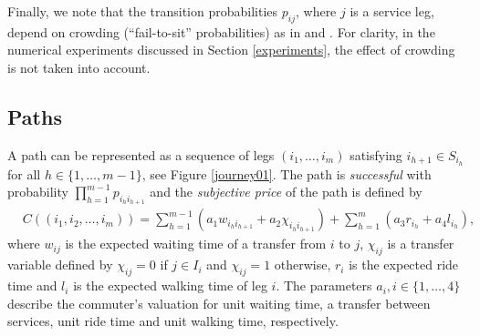 \documentclass[dissertation,draft*]{aaltoseries}
\begin{document}
Finally, we note that the transition probabilities $p_{ij}$, where $j$ is a service leg, depend on crowding (``fail-to-sit'' probabilities)
as in \cite{hamdouch} and \cite{schmocker}. For clarity, in the numerical experiments 
discussed in Section \ref{experiments}, the effect of crowding is not taken into account.

\subsection{Paths}
A path can be represented as a sequence of legs $(i_1,\ldots,i_m)$ satisfying
$i_{h+1} \in S_{i_h}$ for all $h \in \{1,\ldots,m-1\}$, see Figure \ref{journey01}. 
The path is \emph{successful} with probability $\prod_{h=1}^{m-1}p_{i_hi_{h+1}}$ and the \emph{subjective price} of
the path is defined by
\begin{align}
\label{subjectiveprice}
&C \left( (i_1,i_2,\ldots,i_m) \right) 
= \sum_{h=1}^{m-1} (a_1 w_{i_hi_{h+1}} + a_2 \chi_{i_hi_{h+1}}) + \sum_{h=1}^{m} (a_3 r_{i_h} + a_4 l_{i_h}),
\end{align}
where $w_{ij}$ is the expected waiting time of a transfer from $i$ to $j$, $\chi_{ij}$ is a transfer 
variable defined by $\chi_{ij}=0$ if $j \in I_i$ and $\chi_{ij}=1$ otherwise,
$r_i$ is the expected ride time and $l_i$ is the expected walking time %
of leg $i$. 
The parameters $a_i, i\in \{1,\ldots,4\}$ 
describe the commuter's valuation for unit waiting time, a transfer between services, 
unit ride time and unit walking time, respectively.
\end{document}
